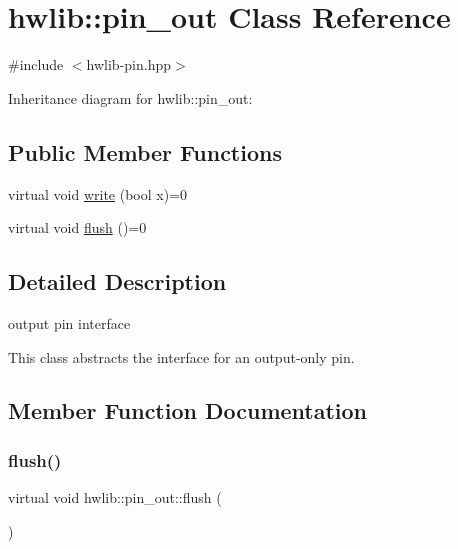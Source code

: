 \hypertarget{classhwlib_1_1pin__out}{}\section{hwlib\+:\+:pin\+\_\+out Class Reference}
\label{classhwlib_1_1pin__out}


{\ttfamily \#include $<$hwlib-\/pin.\+hpp$>$}



Inheritance diagram for hwlib\+:\+:pin\+\_\+out\+:
\subsection*{Public Member Functions}
\begin{DoxyCompactItemize}
\item 
virtual void \hyperlink{classhwlib_1_1pin__out_a8d260a70e503dcfb81987c408e170300}{write} (bool x)=0
\item 
virtual void \hyperlink{classhwlib_1_1pin__out_ac22910317477a52431a44e7e3c66fc57}{flush} ()=0
\end{DoxyCompactItemize}


\subsection{Detailed Description}
output pin interface

This class abstracts the interface for an output-\/only pin. 

\subsection{Member Function Documentation}
\mbox{\label{classhwlib_1_1pin__out_ac22910317477a52431a44e7e3c66fc57}} 
\subsubsection{\texorpdfstring{flush()}{flush()}}
{\footnotesize\ttfamily virtual void hwlib\+::pin\+\_\+out\+::flush (\begin{DoxyParamCaption}{ }\end{DoxyParamCaption})\hspace{0.3cm}{\ttfamily [pure virtual]}}





